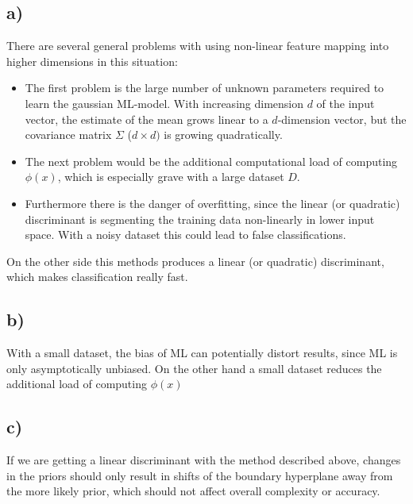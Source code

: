 \documentclass[paper=a4,fontsize=10pt,DIV11,BCOR10mm]{scrartcl}
\begin{document}
	\subsection*{a)} There are several general problems with using non-linear feature mapping into higher dimensions in this situation:
	\begin{itemize}
	\item The first problem is the large number of unknown parameters required to learn the gaussian ML-model. With increasing dimension $d$ of the input vector, the estimate of the mean grows linear to a $d$-dimension vector, but the covariance matrix $\Sigma$ ($d \times d)$ is growing quadratically.
	\item The next problem would be the additional computational load of computing $\phi(x)$, which is especially grave with a large dataset $D$.
	\item Furthermore there is the danger of overfitting, since the linear (or quadratic) discriminant is segmenting the training data non-linearly in lower input space. With a noisy dataset this could lead to false classifications.
	\end{itemize}
	On the other side this methods produces a linear (or quadratic) discriminant, which makes classification really fast.
	
	\subsection*{b)}
	With a small dataset, the bias of ML can potentially distort results, since ML is only asymptotically unbiased. On the other hand a small dataset reduces the additional load of computing $\phi(x)$
	
	\subsection*{c)} If we are getting a linear discriminant with the method described above, changes in the priors should only result in shifts of the boundary hyperplane away from the more likely prior, which should not affect overall complexity or accuracy.
	






\end{document}
